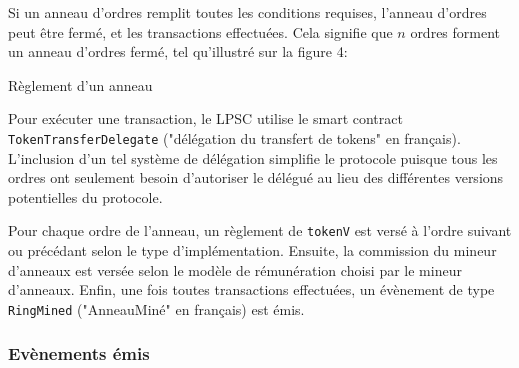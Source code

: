 \documentclass[UTF8,nofonts]{article}
\makeatletter
\newenvironment{figurehere}
 {\def\@captype{figure}}
 {}
\makeatother
\begin{document}
\begin{multicols}{2}
Si un anneau d'ordres remplit toutes les conditions requises, l'anneau d'ordres peut être fermé, et les transactions effectuées. Cela signifie que $n$ ordres forment un anneau d'ordres fermé, tel qu'illustré sur la figure 4:

\begin{center}
\begin{figurehere}
\centering
{}
\caption{Règlement d'un anneau}
\label{fig:settlement}
\end{figurehere}
\end{center}

Pour exécuter une transaction, le LPSC utilise le smart contract \verb|TokenTransferDelegate| ("délégation du transfert de tokens" en français). L'inclusion d'un tel système de délégation simplifie le protocole puisque tous les ordres ont seulement besoin d'autoriser le délégué au lieu des différentes versions potentielles du protocole.

Pour chaque ordre de l'anneau, un règlement de \verb|tokenV| est versé à l'ordre suivant ou précédant selon le type d'implémentation. Ensuite, la commission du mineur d'anneaux est versée selon le modèle de rémunération choisi par le mineur d'anneaux. Enfin, une fois toutes transactions effectuées, un évènement de type \verb|RingMined| ("AnneauMiné" en français) est émis.

\subsubsection{Evènements émis\label{sec:events}}


\end{multicols}
\end{document}
